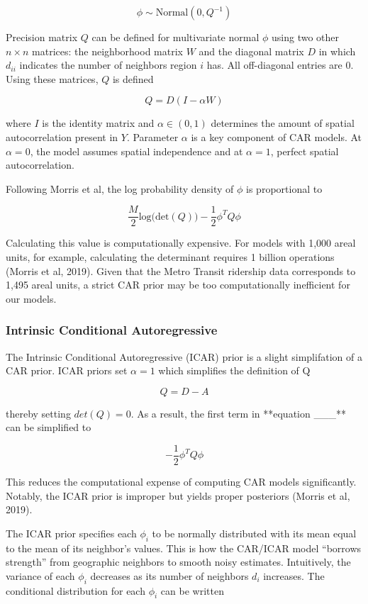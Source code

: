 \documentclass[]{article}
\begin{document}
\[
\phi \sim \text{Normal}(0, Q^{-1})
\]

Precision matrix \(Q\) can be defined for multivariate normal \(\phi\)
using two other \(n \times n\) matrices: the neighborhood matrix \(W\)
and the diagonal matrix \(D\) in which \(d_{ii}\) indicates the number
of neighbors region \(i\) has. All off-diagonal entries are 0. Using
these matrices, \(Q\) is defined

\[
Q = D(I - \alpha W)
\]

where \(I\) is the identity matrix and \(\alpha \in (0, 1)\) determines
the amount of spatial autocorrelation present in \(Y\). Parameter
\(\alpha\) is a key component of CAR models. At \(\alpha = 0\), the
model assumes spatial independence and at \(\alpha = 1\), perfect
spatial autocorrelation.

Following Morris et al, the log probability density of \(\phi\) is
proportional to

\[
\frac{M}{2}\text{log(det}(Q)) - \frac{1}{2}\phi^TQ\phi
\]

Calculating this value is computationally expensive. For models with
1,000 areal units, for example, calculating the determinant requires 1
billion operations (Morris et al, 2019). Given that the Metro Transit
ridership data corresponds to 1,495 areal units, a strict CAR prior may
be too computationally inefficient for our models.

\subsubsection{Intrinsic Conditional
Autoregressive}\label{intrinsic-conditional-autoregressive}

The Intrinsic Conditional Autoregressive (ICAR) prior is a slight
simplifation of a CAR prior. ICAR priors set \(\alpha = 1\) which
simplifies the definition of Q

\[
Q = D-A
\]

thereby setting \(det(Q) = 0\). As a result, the first term in
**equation \_\_\_** can be simplified to

\[
-\frac{1}{2}\phi^TQ\phi
\]

This reduces the computational expense of computing CAR models
significantly. Notably, the ICAR prior is improper but yields proper
posteriors (Morris et al, 2019).

The ICAR prior specifies each \(\phi_i\) to be normally distributed with
its mean equal to the mean of its neighbor's values. This is how the
CAR/ICAR model ``borrows strength'' from geographic neighbors to smooth
noisy estimates. Intuitively, the variance of each \(\phi_i\) decreases
as its number of neighbors \(d_i\) increases. The conditional
distribution for each \(\phi_i\) can be written
\end{document}

